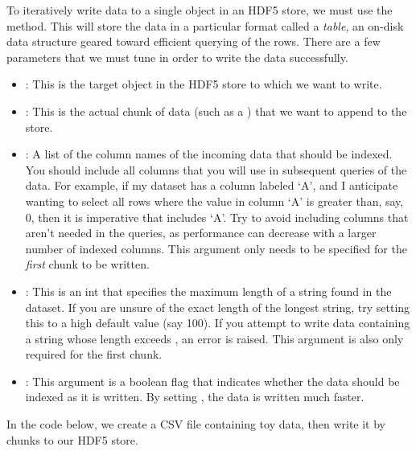 To iteratively write data to a single object in an HDF5 store, we must use the  method. This will store the data in a 
particular format called a \emph{table}, an on-disk data structure geared toward efficient querying of the rows. There are a few
parameters that we must tune in order to write the data successfully.
\begin{itemize}
\item {}: This is the target object in the HDF5 store to which we want to write. 
\item {}: This is the actual chunk of data (such as a ) that we want to append to the store.
\item {}: A list of the column names of the incoming data that should be indexed. You should include all 
columns that you will use in subsequent queries of the data. For example, if my dataset has a column labeled `A', and I anticipate
wanting to select all rows where the value in column `A' is greater than, say, 0, then it is imperative that  includes
`A'. Try to avoid including columns that aren't needed in the queries, as performance can decrease with a larger number of indexed
columns. This argument only needs to be specified for the \emph{first} chunk to be written.
\item {}: This is an int that specifies the maximum length of a string found in the dataset. If you are unsure of the 
exact length of the longest string, try setting this to a high default value (say 100). If you attempt to write data containing 
a string whose length exceeds , an error is raised. This argument is also only required for the first chunk.
\item {}: This argument is a boolean flag that indicates whether the data should be indexed as it is written. By setting
, the data is written much faster.
\end{itemize}
In the code below, we create a CSV file containing toy data, then write it by chunks to our HDF5 store.
